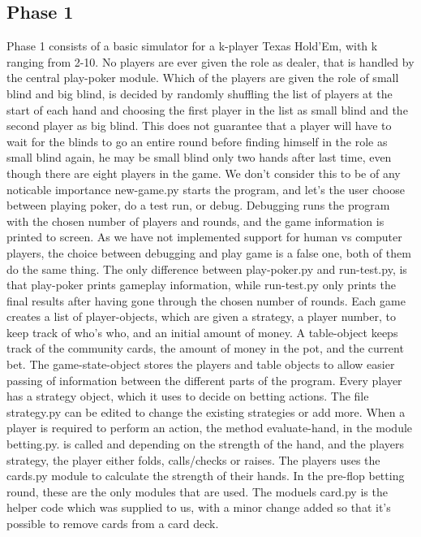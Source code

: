 \documentclass[titlepage]{article}
\begin{document}
\begin{itemize}
	\subsection{Phase 1}
	    Phase 1 consists of a basic simulator for a k-player Texas Hold'Em, with k ranging from 2-10. No players are ever given the role as dealer, that is handled by the central play-poker module. Which of the players are given the role of small blind and big blind, is decided by randomly shuffling the list of players at the start of each hand and choosing the first player in the list as small blind and the second player as big blind. This does not guarantee that a player will have to wait for the blinds to go an entire round before finding himself in the role as small blind again, he may be small blind only two hands after last time, even though there are eight players in the game. We don't consider this to be of any noticable importance
		new-game.py starts the program, and let's the user choose between playing poker, do a test run, or debug. Debugging runs the program with the chosen number of players and rounds, and the game information is printed to screen. As we have not implemented support for human vs computer players, the choice between debugging and play game is a false one, both of them do the same thing. The only difference between play-poker.py and run-test.py, is that play-poker prints gameplay information, while run-test.py only prints the final results after having gone through the chosen number of rounds. Each game creates a list of player-objects, which are given a strategy, a player number, to keep track of who's who, and an initial amount of money. A table-object keeps track of the community cards, the amount of money in the pot, and the current bet. The game-state-object stores the players and table objects to allow easier passing of information between the different parts of the program. Every player has a strategy object, which it uses to decide on betting actions. The file strategy.py can be edited to change the existing strategies or add more. When a player is required to perform an action, the method evaluate-hand, in the module betting.py. is called and depending on the strength of the hand, and the players strategy, the player either folds, calls/checks or raises. The players uses the cards.py module to calculate the strength of their hands. In the pre-flop betting round, these are the only modules that are used. The moduels card.py is the helper code which was supplied to us, with a minor change added so that it's possible to remove cards from a card deck.
		

\end{itemize}
\end{document}
